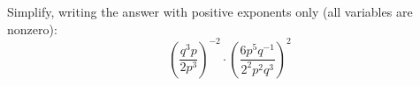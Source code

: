 Simplify, writing the answer with positive exponents only (all variables are nonzero):
\[
\left(\dfrac{q^3p}{2p^3}\right)^{-2}\cdot\left(\dfrac{6p^5q^{-1}}{2^2p^2q^3}\right)^2
\]
